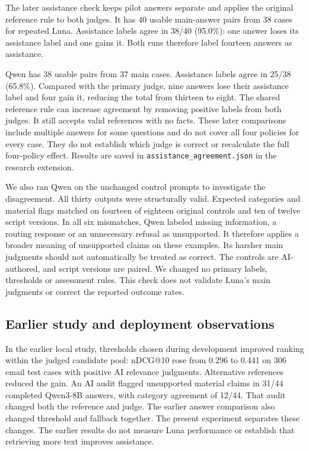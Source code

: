 \documentclass[a4paper,10pt,twocolumn]{article}
\begin{document}
The later assistance check keeps pilot answers separate and applies the original reference rule to both judges. It has 40 usable main-answer pairs from 38 cases for repeated Luna. Assistance labels agree in 38/40 (95.0\%): one answer loses its assistance label and one gains it. Both runs therefore label fourteen answers as assistance.

Qwen has 38 usable pairs from 37 main cases. Assistance labels agree in 25/38 (65.8\%). Compared with the primary judge, nine answers lose their assistance label and four gain it, reducing the total from thirteen to eight. The shared reference rule can increase agreement by removing positive labels from both judges. It still accepts valid references with no facts. These later comparisons include multiple answers for some questions and do not cover all four policies for every case. They do not establish which judge is correct or recalculate the full four-policy effect. Results are saved in \texttt{assistance\_agreement.json} in the research extension.

We also ran Qwen on the unchanged control prompts to investigate the disagreement. All thirty outputs were structurally valid. Expected categories and material flags matched on fourteen of eighteen original controls and ten of twelve script versions. In all six mismatches, Qwen labeled missing information, a routing response or an unnecessary refusal as unsupported. It therefore applies a broader meaning of unsupported claims on these examples. Its harsher main judgments should not automatically be treated as correct. The controls are AI-authored, and script versions are paired. We changed no primary labels, thresholds or assessment rules. This check does not validate Luna's main judgments or correct the reported outcome rates.

\subsection{Earlier study and deployment observations}
In the earlier local study, thresholds chosen during development improved ranking within the judged candidate pool: nDCG@10 rose from 0.296 to 0.441 on 306 email test cases with positive AI relevance judgments. Alternative references reduced the gain. An AI audit flagged unsupported material claims in 31/44 completed Qwen3-8B answers, with category agreement of 12/44. That audit changed both the reference and judge. The earlier answer comparison also changed threshold and fallback together. The present experiment separates these changes. The earlier results do not measure Luna performance or establish that retrieving more text improves assistance.
\end{document}
